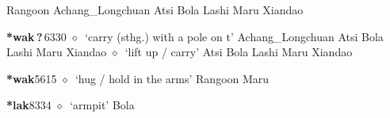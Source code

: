 \begin{list}{}{\leftmargin=1.5em \itemindent=-1.5em}
         Rangoon 
\hspace{1ex}
         Achang\_Longchuan 
\hspace{1ex}
         Atsi 
\hspace{1ex}
         Bola 
\hspace{1ex}
         Lashi 
\hspace{1ex}
         Maru 
\hspace{1ex}
         Xiandao 
  \item {\footnotesize \textbf{*wak\,?\,}}{\tiny 6330}
\hspace{1ex}
         $\diamond$~`carry (sthg.) with a pole on t'
         Achang\_Longchuan 
\hspace{1ex}
         Atsi 
\hspace{1ex}
         Bola 
\hspace{1ex}
         Lashi 
\hspace{1ex}
         Maru 
\hspace{1ex}
         Xiandao 
\hspace{1ex}
         $\diamond$~`lift up / carry'
         Atsi 
\hspace{1ex}
         Bola 
\hspace{1ex}
         Lashi 
\hspace{1ex}
         Maru 
\hspace{1ex}
         Xiandao 
  \item {\footnotesize \textbf{*wak}}{\tiny 5615}
\hspace{1ex}
         $\diamond$~`hug / hold in the arms'
         Rangoon 
\hspace{1ex}
         Maru 
  \item {\footnotesize \textbf{*lak}}{\tiny 8334}
\hspace{1ex}
         $\diamond$~`armpit'
         Bola 
\hspace{1ex}

\end{list}
